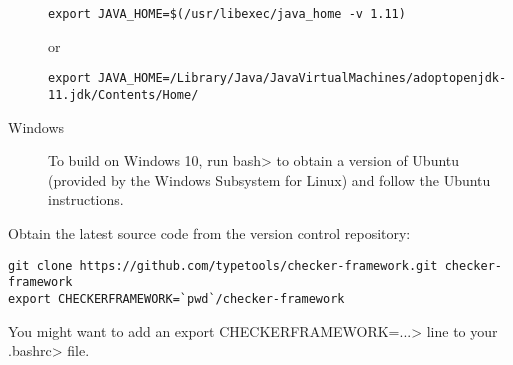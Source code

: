 \begin{description}
\begin{Verbatim}
export JAVA_HOME=$(/usr/libexec/java_home -v 1.11)
\end{Verbatim}
or
\begin{Verbatim}
export JAVA_HOME=/Library/Java/JavaVirtualMachines/adoptopenjdk-11.jdk/Contents/Home/
\end{Verbatim}


\item[Windows]
  To build on Windows 10,
  run \<bash> to obtain a version of
  Ubuntu (provided by the Windows Subsystem for Linux) and follow the Ubuntu
  instructions.


\end{description}



Obtain the latest source code from the version control repository:

\begin{Verbatim}
git clone https://github.com/typetools/checker-framework.git checker-framework
export CHECKERFRAMEWORK=`pwd`/checker-framework
\end{Verbatim}

You might want to add an \<export CHECKERFRAMEWORK=...> line to your
\<.bashrc> file.




